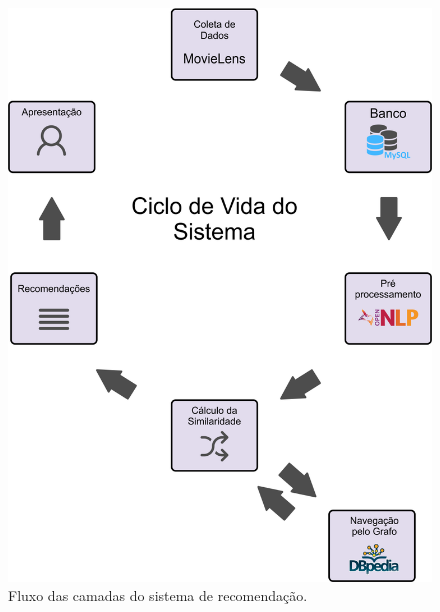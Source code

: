 \begin{figure}
	\centering
	\includegraphics[scale=0.42]{imagens/recsys_fluxo.png}
	\caption{Fluxo das camadas do sistema de recomendação.}
	\label{fig:recsys_fluxo}
\end{figure}

